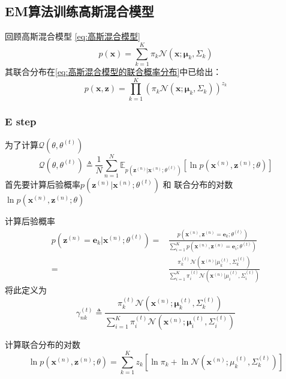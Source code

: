 \documentclass[withoutpreface,bwprint]{NoteBook}
\begin{document}
    
\subsection{EM算法训练高斯混合模型}

回顾高斯混合模型
\cref{eq:高斯混合模型}
$$
p(\mathbf{x}) = \sum_{k=1}^K \pi_k \mathcal{N}(\mathbf{x};\bm{\mu}_k,\Sigma_k)
$$
其联合分布在\cref{eq:高斯混合模型的联合概率分布}中已给出：
$$
p(\mathbf{x},\mathbf{z}) 
= \prod_{k=1}^{K} ( \pi_k  \mathcal{N}(\mathbf{x};\bm{\mu}_k,\Sigma_k))^{z_k}
$$

\subsubsection{E step}
为了计算$\mathcal{Q}(\theta,\theta^{(t)}) $
$$
\mathcal{Q}(\theta,\theta^{(t)}) \triangleq \frac{1}{N} \sum_{n=1}^{N} \mathbb{E}_{p(\mathbf{z}^{(n)}|\mathbf{x}^{(n)};\theta^{(t)})} \left[ \ln p(\mathbf{x}^{(n)},\mathbf{z}^{(n)};\theta)\right]
$$
首先要计算后验概率$p(\mathbf{z}^{(n)}|\mathbf{x}^{(n)};\theta^{(t)})$ 
和 联合分布的对数$\ln p(\mathbf{x}^{(n)},\mathbf{z}^{(n)};\theta)$

计算后验概率
\begin{align}
    \label{eq:高斯混合模型E步后验概率计算}
    p(\mathbf{z}^{(n)}=\mathbf{e}_k|\mathbf{x}^{(n)};\theta^{(t)})
    =& \frac{p(\mathbf{x}^{(n)},\mathbf{z}^{(n)}=\mathbf{e}_k;\theta^{(t)})}{\sum_{i=1}^{K} p(\mathbf{x}^{(n)},\mathbf{z}^{(n)}=\mathbf{e}_i;\theta^{(t)})} \nonumber \\
    =& \frac{\pi_k^{(t)} \mathcal{N}(\mathbf{x}^{(n)}| \mu_k^{(t)},\Sigma_k^{(t)})}{\sum_{i=1}^{K} \pi_i^{(t)} \mathcal{N}(\mathbf{x}^{(n)}|\mu_i^{(t)},\Sigma_i^{(t)})}
\end{align}
将此定义为
\begin{equation}
    \label{eq:gamma定义}
    \gamma_{nk}^{(t)} \triangleq \frac{\pi_k^{(t)} \mathcal{N}(\mathbf{x}^{(n)}; \bm{\mu}_k^{(t)},\Sigma_k^{(t)} )}{\sum_{i=1}^{K} \pi_i^{(t)} \mathcal{N}(\mathbf{x}^{(n)}; \bm{\mu}_i^{(t)},\Sigma_i^{(t)} )}
\end{equation}

计算联合分布的对数
\begin{equation}
    \label{eq:高斯混合模型E步联合分布对数计算}
    \ln p(\mathbf{x}^{(n)},\mathbf{z}^{(n)};\theta) = \sum_{k=1}^{K} z_k \left[ \ln \pi_k + \ln \mathcal{N}(\mathbf{x}^{(n)}; \mu_k^{(t)},\Sigma_k^{(t)} )\right]
\end{equation}
\end{document}
